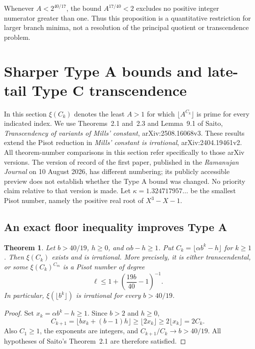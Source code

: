 \documentclass[11pt,a4paper]{article}
\newtheorem{theorem}{Theorem}[section]
\theoremstyle{definition}
\theoremstyle{remark}
\numberwithin{equation}{section}
\begin{document}
Whenever $A<2^{40/17}$, the bound $A^{17/40}<2$ excludes no positive integer numerator greater than one. Thus this proposition is a quantitative restriction for larger branch minima, not a resolution of the principal quotient or transcendence problem.

\section{Sharper Type A bounds and late-tail Type C transcendence}

In this section $\xi(C_k)$ denotes the least $A>1$ for which
$\lfloor A^{C_k}\rfloor$ is prime for every indicated index. We use
Theorems~2.1 and~2.3 and Lemma~9.1 of Saito,
\emph{Transcendency of variants of Mills' constant},
arXiv:2508.16068v3. These results extend the Pisot reduction in
\emph{Mills' constant is irrational}, arXiv:2404.19461v2.
All theorem-number comparisons in this section refer specifically
to those arXiv versions. The version of record of the first paper,
published in the \emph{Ramanujan Journal} on 10 August 2026, has
different numbering; its publicly accessible preview does not
establish whether the Type A bound was changed. No priority claim
relative to that version is made.
Let $\kappa=1.324717957\ldots$ be the smallest Pisot number, namely
the positive real root of $X^3-X-1$.

\subsection{An exact floor inequality improves Type A}

\begin{theorem}\label{mil:thm:ac-floor}
Let $b>40/19$, $h\ge0$, and $\alpha b-h\ge1$. Put
$C_k=\lfloor\alpha b^k-h\rfloor$ for $k\ge1$. Then $\xi(C_k)$
exists and is irrational. More precisely, it is either transcendental,
or some $\xi(C_k)^{C_m}$ is a Pisot number of degree
\[
 \ell\le 1+\left(\frac{19b}{40}-1\right)^{-1}.
\]
In particular, $\xi(\lfloor b^k\rfloor)$ is irrational for every
$b>40/19$.
\end{theorem}
\begin{proof}
Set $x_k=\alpha b^k-h\ge1$. Since $b>2$ and $h\ge0$,
\[
 C_{k+1}=\lfloor b x_k+(b-1)h\rfloor
 \ge\lfloor2x_k\rfloor\ge2\lfloor x_k\rfloor=2C_k.
\]
Also $C_1\ge1$, the exponents are integers, and
$C_{k+1}/C_k\to b>40/19$. All hypotheses of Saito's
Theorem~2.1 are therefore satisfied.
\end{proof}
\end{document}
